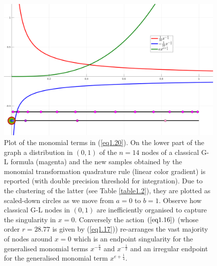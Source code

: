 \documentclass[a4paper, twosided]{book}
\begin{document}
\begin{center}
        \begin{figure}[h]
        \captionsetup{singlelinecheck=off}
        \includegraphics[keepaspectratio,width=\textwidth]{images/GenPolyMonMap.png}
        \caption{Plot of the monomial terms in (\ref{eq1.20}). On the lower part of the graph a distribution in $(0,1)$ of the $n=14$ nodes of a classical G-L formula (magenta) and the new samples obtained by the monomial transformation quadrature rule (linear color gradient) is reported (with double precision threshold for integration). Due to the clustering of the latter (see Table \ref{table1.2}), they are plotted as scaled-down circles as we move from $a=0$ to $b=1$. Observe how classical G-L nodes in $(0,1)$ are inefficiently organised to capture the singularity in $x=0$. Conversely the action $(\ref{eq1.16})$ (whose order $r=28.77$ is given by (\ref{eq1.17})) re-arranges the vast majority of nodes around $x=0$ which is an endpoint singularity for the generalised monomial terms $x^{-\frac{\pi}{4}}$ and $x^{-\frac{1}{2}}$ and an irregular endpoint for the generalised monomial term $x^{e+\frac{1}{4}}$.}
        \label{Fig1.2}
        \end{figure}
\end{center}

\newpage
\end{document}

